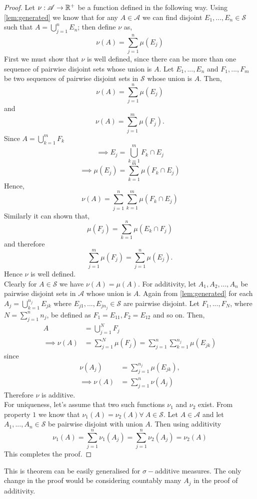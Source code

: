\begin{proof}
  Let $\nu: \mathscr{A}\to \mathbb{R}^+$ be a function defined in the following way. Using \cref{lem:generated} we know that for any $A\in \mathscr{A}$ we can find disjoint $E_1,...,E_n\in \mathscr{S}$ such that $A = \bigcup_{j=1}^n E_n$; then define $\nu$ as,
  \[\nu(A) = \sum_{j=1}^n\mu(E_j)\]
  First we must show that $\nu$ is well defined, since there can be more than one sequence of pairwise disjoint sets whose union is $A$. Let $E_1,...,E_n$ and $F_1,...,F_m$ be two sequences of pairwise disjoint sets in $ \mathscr{S}$ whose union is $A$. Then, 
  \[\nu(A) = \sum_{j=1}^n\mu(E_j) \]
  and
  \[\nu(A) = \sum_{j=1}^m\mu(F_j). \]
  Since $A = \bigcup_{k=1}^m F_k$
  \[\implies E_j = \bigcup_{k=1}^m F_k\cap E_j\]
  \[\implies \mu(E_j) = \sum_{k=1}^m \mu(F_k \cap E_j)\]
  Hence,
  \[\nu(A) =\sum_{j=1}^n\sum_{k=1}^m \mu(F_k \cap E_j) \]
  Similarly it can shown that,
  \[\mu(F_j) = \sum_{k=1}^n \mu(E_k \cap F_j)\]
  and therefore
  \[\sum_{j=1}^m\mu(F_j) =\sum_{j=1}^n\mu(E_j). \]
  Hence $\nu$ is well defined. \\

  Clearly for $A\in \mathscr{S}$ we have $\nu(A) = \mu(A)$. For additivity, let $A_1, A_2,...,A_n$ be pairwise disjoint sets in $ \mathscr{A}$ whose union is $A$. Again from \cref{lem:generated} for each $A_j = \bigcup_{k=1}^{n_j}E_{jk}$ where $E_{j1},...,E_{jn_j} \in \mathscr{S}$ are pairwise disjoint. Let $F_1,...,F_{N}$, where $N=\sum_{j=1}^n n_j$, be defined as $F_1 = E_{11}, F_2 = E_{12}$ and so on. Then,
  \begin{align*}
    A &= \bigcup_{j=1}^N F_j\\
    \implies \nu(A) &= \sum_{j=1}^{N} \mu(F_j) = \sum_{j=1}^{n}\sum_{k=1}^{n_j} \mu(E_{jk})
  \end{align*}
  since
  \begin{align*}
    \nu(A_j) &= \sum_{j=1}^{n_j} \mu(E_{jk}),\\
    \implies \nu(A) &= \sum_{j=1}^n \nu(A_j)
  \end{align*}
  Therefore $\nu$ is additive.\\

  For uniqueness, let's assume that two such functions $\nu_1$ and $\nu_2$ exist. From property $1$ we know that $\nu_1(A) = \nu_2(A) \forall\ A\in \mathscr{S}$. Let $A\in \mathscr{A}$ and let $A_1,...,A_n\in \mathscr{S}$ be pairwise disjoint with union $A$. Then using additivity 
  \[\nu_1(A) = \sum_{j=1}^n\nu_1(A_j) = \sum_{j=1}^n\nu_2(A_j) = \nu_2(A)\]
  This completes the proof.
\end{proof}
\begin{remark}
  This is theorem can be easily generalised for $\sigma-$additive measures. The only change in the proof would be considering countably many $A_j$ in the proof of additivity.
\end{remark}
